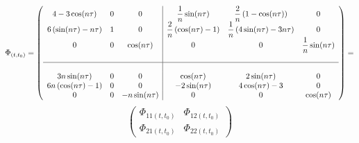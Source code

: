 \documentclass[11pt, a4paper]{article}
\begin{document}
\begin{equation*}
    \Phi_{(t,t_0)} = \left(\begin{array}{ccc|ccc}
        4-3\cos(n\tau) & 0 & 0 &\displaystyle \frac{1}{n}\sin(n\tau) &\displaystyle \frac{2}{n}\left(1-\cos(n\tau)\right) & 0 \\ 
        6\left(\sin(n\tau)-n\tau\right) & 1 & 0 &\displaystyle \frac{2}{n}\left(\cos(n\tau)-1\right) &\displaystyle \frac{1}{n}\left(4\sin(n\tau)-3n\tau\right) & 0 \\ 0 & 0 & \cos(n\tau) & 0 & 0 & \displaystyle\frac{1}{n}\sin(n\tau) \\ &&& \\ \hline &&& \\
        3n\sin(n\tau) & 0 & 0 & \cos(n\tau) & 2\sin(n\tau) & 0 \\
        6n\left(\cos(n\tau)-1\right) & 0 & 0 & -2\sin(n\tau) & 4\cos(n\tau)-3 & 0 \\
        0 & 0 & -n\sin(n\tau) & 0 & 0 & \cos(n\tau) 
    \end{array}\right) =  
\end{equation*}
\begin{equation}
    \begin{pmatrix}
        \Phi_{11(t,t_0)} & \Phi_{12(t,t_0)} \\
        \Phi_{21(t,t_0)} & \Phi_{22(t,t_0)}
    \end{pmatrix} 
\end{equation}
\end{document}
